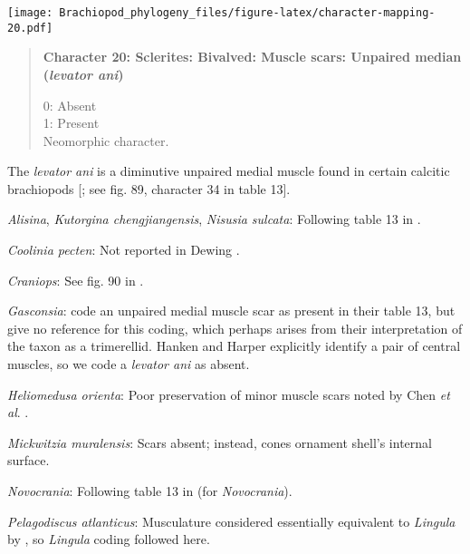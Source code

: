 \documentclass[openany]{book}
\theoremstyle{definition}
\theoremstyle{definition}
\theoremstyle{definition}
\theoremstyle{remark}
\begin{document}
\texttt{[image: Brachiopod\_phylogeny\_files/figure-latex/character-mapping-20.pdf]}

\begin{quote}
\textbf{Character 20: Sclerites: Bivalved: Muscle scars: Unpaired median
(\emph{levator ani})}

0: Absent\\
1: Present\\
Neomorphic character.
\end{quote}

The \emph{levator ani} is a diminutive unpaired medial muscle found in
certain calcitic brachiopods
{[}\citet{Williams2000LinguliformeaCraniiformea}; see fig. 89, character
34 in table 13{]}.

\hypertarget{Alisina-coding-20}{}
\emph{Alisina}, \emph{Kutorgina chengjiangensis}, \emph{Nisusia
sulcata}: Following table 13 in
\citet{Williams2000LinguliformeaCraniiformea}.

\hypertarget{Coolinia_pecten-coding-20}{}
\emph{Coolinia pecten}: Not reported in Dewing
\citeyearpar{Dewing2001Hingemodifications}.

\hypertarget{Craniops-coding-20}{}
\emph{Craniops}: See fig. 90 in
\citet{Williams2000LinguliformeaCraniiformea}.

\hypertarget{Gasconsia-coding-20}{}
\emph{Gasconsia}: \citet{Williams2000LinguliformeaCraniiformea} code an
unpaired medial muscle scar as present in their table 13, but give no
reference for this coding, which perhaps arises from their
interpretation of the taxon as a trimerellid. Hanken and Harper
\citeyearpar[p.~249 and text-fig. 2]{Hanken1985Thetaxonomy} explicitly
identify a pair of central muscles, so we code a \emph{levator ani} as
absent.

\hypertarget{Heliomedusa_orienta-coding-20}{}
\emph{Heliomedusa orienta}: Poor preservation of minor muscle scars
noted by Chen \emph{et al}. \citeyearpar{Chen2007Reinterpretationof}.

\hypertarget{Mickwitzia_muralensis-coding-20}{}
\emph{Mickwitzia muralensis}: Scars absent; instead, cones ornament
shell's internal surface.

\hypertarget{Novocrania-coding-20}{}
\emph{Novocrania}: Following table 13 in
\citet{Williams2000LinguliformeaCraniiformea} (for \emph{Novocrania}).

\hypertarget{Pelagodiscus_atlanticus-coding-20}{}
\emph{Pelagodiscus atlanticus}: Musculature considered essentially
equivalent to \emph{Lingula} by
\citet{Williams2000LinguliformeaCraniiformea}, so \emph{Lingula} coding
followed here.
\end{document}

